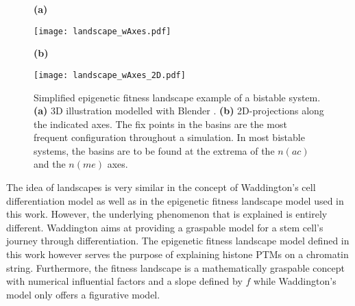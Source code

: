             \begin{figure}[!htpb]
                \centering
                \begin{minipage}[t]{\textwidth}
                    \begin{minipage}{0.19\textwidth}
                        \caption*{\small \textbf{(a)}}
                    \end{minipage}
                    \begin{minipage}{0.8\textwidth}
                        \texttt{[image: landscape\_wAxes.pdf]}
                    \end{minipage}
                    \begin{minipage}{0.19\textwidth}
                        \caption*{\small \textbf{(b)}}
                    \end{minipage}
                    \begin{minipage}{0.8\textwidth}
                        \texttt{[image: landscape\_wAxes\_2D.pdf]}
                    \end{minipage}
                \end{minipage}
                \caption{Simplified epigenetic fitness landscape example of a bistable system. \textbf{(a)} 3D illustration modelled with Blender \cite{blender}. \textbf{(b)} 2D-projections along the indicated axes. The fix points in the basins are the most frequent configuration throughout a simulation. In most bistable systems, the basins are to be found at the extrema of the $n(ac)$ and the $n(me)$ axes.}
                \label{img:fitnessLandscape}
            \end{figure}

            The idea of landscapes is very similar in the concept of Waddington's cell differentiation model as well as in the epigenetic fitness landscape model used in this work. However, the underlying phenomenon that is explained is entirely different. Waddington aims at providing a graspable model for a stem cell's journey through differentiation. The epigenetic fitness landscape model defined in this work however serves the purpose of explaining histone PTMs on a chromatin string. Furthermore, the fitness landscape is a mathematically graspable concept with numerical influential factors and a slope defined by $f$ while Waddington's model only offers a figurative model.

